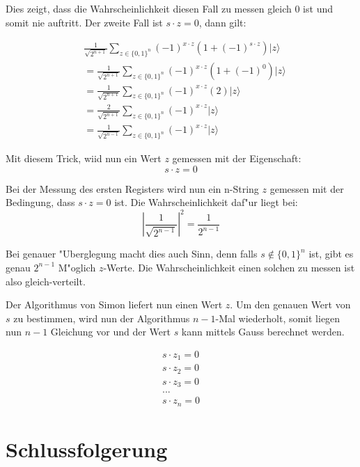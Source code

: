 \begin{refsection}
Dies zeigt, dass die Wahrscheinlichkeit diesen Fall zu messen gleich 0 ist und
somit nie auftritt. Der zweite Fall ist $s \cdot z = 0$, dann gilt:

\begin{align*}
    &\frac1{\sqrt{2^{n + 1}}}
      \sum_{z \in \{0,1\}^n}  { (-1)^{x \cdot z} ( 1 + (-1)^{ s \cdot z}) |z\rangle } 
    \\
    &= 
    \frac1{\sqrt{2^{n + 1}}}
      \sum_{z \in \{0,1\}^n}  { (-1)^{x \cdot z} ( 1 + (-1)^0) |z\rangle } 
    \\
    &= 
    \frac1{\sqrt{2^{n + 1}}}
      \sum_{z \in \{0,1\}^n}  { (-1)^{x \cdot z} (2) |z\rangle } 
    \\
    &= 
    \frac{2}{\sqrt{2^{n + 1}}} 
      \sum_{z \in \{0,1\}^n}  { (-1)^{x \cdot z}|z\rangle } 
    \\
    &= 
    \frac1{\sqrt{2^{n - 1}}} 
      \sum_{z \in \{0,1\}^n}  { (-1)^{x \cdot z}|z\rangle } 
\end{align*}

Mit diesem Trick, wiid nun ein Wert $z$ gemessen mit der Eigenschaft:
\[
    s \cdot z = 0
\]

Bei der Messung des ersten Registers wird nun ein n-String $z$ gemessen mit der
Bedingung, dass $s \cdot z = 0$ ist. Die Wahrscheinlichkeit daf"ur liegt bei:
\[
    |\frac1{\sqrt{2^{n - 1}}}|^2 = \frac1{2^{n-1}} 
\]

Bei genauer "Uberglegung macht dies auch Sinn, denn falls $s \notin \{0,1\}^n$
ist, gibt es genau $2^{n-1}$ M"oglich $z$-Werte. Die Wahrscheinlichkeit einen
solchen zu messen ist also gleich-verteilt.

Der Algorithmus von Simon liefert nun einen Wert $z$. Um den genauen Wert von
$s$ zu bestimmen, wird nun der Algorithmus $n-1$-Mal wiederholt, somit liegen
nun $n-1$ Gleichung vor und der Wert $s$ kann mittels Gauss berechnet werden.

\begin{align*}
    s \cdot z_{1} = 0
    \\
    s \cdot z_{2} = 0
    \\
    s \cdot z_{3} = 0
    \\
    ...
    \\
    s \cdot z_{n} = 0
\end{align*}


\section{Schlussfolgerung}


\end{refsection}
